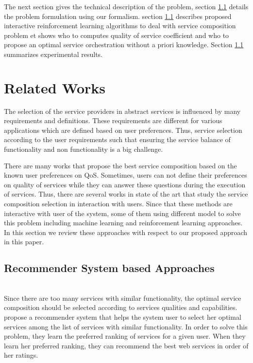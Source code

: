 \documentclass[10pt,journal,compsoc]{IEEEtran}
\begin{document}
The next section gives the technical description of the problem, section \ref{} details the problem formulation using our formalism. section \ref{} describes proposed interactive reinforcement learning algorithms to deal with service composition problem et shows who to computes  quality of service coefficient and who to propose an optimal service orchestration without a priori knowledge. Section \ref{} summarizes experimental results.  

\section{Related Works}\label{sec:related-work}

The selection of the service providers in abstract services is influenced by many requirements and definitions. These requirements are different for various applications which are defined based on user preferences. Thus, service selection according to the user requirements such that ensuring the service balance of functionality and non functionality is a big challenge. 


There are many works that propose the best service composition based on the known user preferences on QoS. Sometimes, users can not define their preferences on quality of services while they can answer these questions during the execution of services. Thus, there are several works in state of the art that study the service composition selection in interaction with users. Since that these methods are interactive with user of the system, some of them using different model to solve this problem including machine learning and reinforcement learning approaches. In this section we review these approaches with respect to our proposed approach in this paper. 

\subsection{Recommender System based Approaches}
\cite{Manikrao2005}  \\
Since there are too many services with similar functionality, the optimal service composition should be selected according to services qualities and capabilities. \cite{Manikrao2005} propose a recommender system that helps the system user to select her optimal services among the list of services with similar functionality. In order to solve this problem, they learn the preferred ranking of services for a given user. When they learn her preferred ranking, they can recommend the best web services in order of her ratings. 
\end{document}
